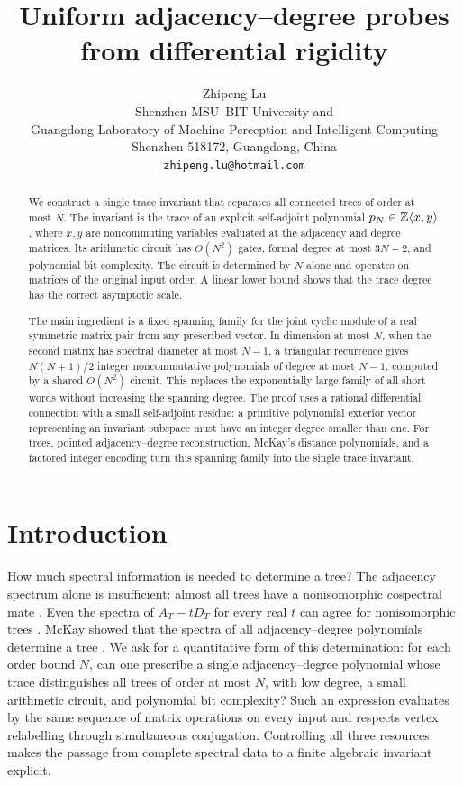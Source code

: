\documentclass[11pt,letterpaper]{article}
\title{Uniform adjacency--degree probes from differential rigidity}
\author{Zhipeng Lu\\[0.4em]
Shenzhen MSU--BIT University and\\
Guangdong Laboratory of Machine Perception and Intelligent Computing\\
Shenzhen 518172, Guangdong, China\\
\texttt{zhipeng.lu@hotmail.com}}
\date{}
\theoremstyle{definition}\newtheorem{definition}[theorem]{Definition}
\theoremstyle{remark}\newtheorem{remark}[theorem]{Remark}
\begin{document}
\hypersetup{pageanchor=false}
\begin{titlepage}
\maketitle
\begin{abstract}
\normalsize
We construct a single trace invariant that separates all connected trees of order at most $N$. The invariant is the trace of an explicit self-adjoint polynomial $p_N\in\mathbb Z\langle x,y\rangle$, where $x,y$ are noncommuting variables evaluated at the adjacency and degree matrices. Its arithmetic circuit has $O(N^2)$ gates, formal degree at most $3N-2$, and polynomial bit complexity. The circuit is determined by $N$ alone and operates on matrices of the original input order. A linear lower bound shows that the trace degree has the correct asymptotic scale.

The main ingredient is a fixed spanning family for the joint cyclic module of a real symmetric matrix pair from any prescribed vector. In dimension at most $N$, when the second matrix has spectral diameter at most $N-1$, a triangular recurrence gives $N(N+1)/2$ integer noncommutative polynomials of degree at most $N-1$, computed by a shared $O(N^2)$ circuit. This replaces the exponentially large family of all short words without increasing the spanning degree. The proof uses a rational differential connection with a small self-adjoint residue: a primitive polynomial exterior vector representing an invariant subspace must have an integer degree smaller than one. For trees, pointed adjacency--degree reconstruction, McKay's distance polynomials, and a factored integer encoding turn this spanning family into the single trace invariant.
\end{abstract}
\thispagestyle{empty}
\end{titlepage}
\setcounter{page}{1}
\hypersetup{pageanchor=true}

\section{Introduction}
How much spectral information is needed to determine a tree? The adjacency spectrum alone is insufficient: almost all trees have a nonisomorphic cospectral mate \cite{Schwenk}. Even the spectra of $A_T-tD_T$ for every real $t$ can agree for nonisomorphic trees \cite{GodsilSun,FanEtAl}. McKay showed that the spectra of all adjacency--degree polynomials determine a tree \cite[Theorem 5.3]{McKay}. We ask for a quantitative form of this determination: for each order bound $N$, can one prescribe a single adjacency--degree polynomial whose trace distinguishes all trees of order at most $N$, with low degree, a small arithmetic circuit, and polynomial bit complexity? Such an expression evaluates by the same sequence of matrix operations on every input and respects vertex relabelling through simultaneous conjugation. Controlling all three resources makes the passage from complete spectral data to a finite algebraic invariant explicit.
\end{document}
